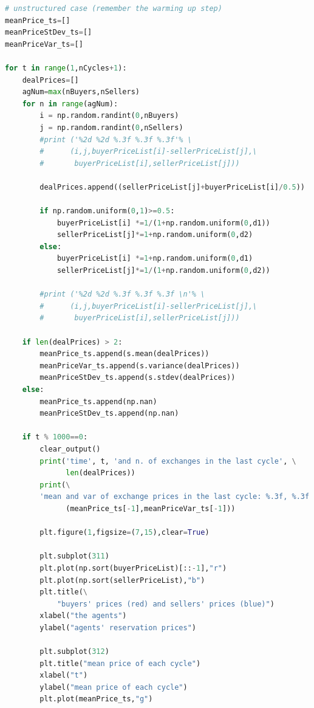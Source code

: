 \documentclass[12pt]{report}
\begin{document}
\begin{lstlisting}[language=Python, caption=Warming up of the model, basicstyle=\ttfamily\footnotesize]
# unstructured case (remember the warming up step)
meanPrice_ts=[]
meanPriceStDev_ts=[]
meanPriceVar_ts=[]

for t in range(1,nCycles+1):    
    dealPrices=[]
    agNum=max(nBuyers,nSellers)
    for n in range(agNum):
        i = np.random.randint(0,nBuyers)
        j = np.random.randint(0,nSellers)
        #print ('%2d %2d %.3f %.3f %.3f'% \
        #      (i,j,buyerPriceList[i]-sellerPriceList[j],\
        #       buyerPriceList[i],sellerPriceList[j]))
        
        dealPrices.append((sellerPriceList[j]+buyerPriceList[i]/0.5))
        
        if np.random.uniform(0,1)>=0.5:    
            buyerPriceList[i] *=1/(1+np.random.uniform(0,d1))
            sellerPriceList[j]*=1+np.random.uniform(0,d2)
        else:
            buyerPriceList[i] *=1+np.random.uniform(0,d1)
            sellerPriceList[j]*=1/(1+np.random.uniform(0,d2))

        #print ('%2d %2d %.3f %.3f %.3f \n'% \
        #      (i,j,buyerPriceList[i]-sellerPriceList[j],\
        #       buyerPriceList[i],sellerPriceList[j]))
           
    if len(dealPrices) > 2:
        meanPrice_ts.append(s.mean(dealPrices))
        meanPriceVar_ts.append(s.variance(dealPrices))
        meanPriceStDev_ts.append(s.stdev(dealPrices))
    else:
        meanPrice_ts.append(np.nan)
        meanPriceStDev_ts.append(np.nan)

    if t % 1000==0:
        clear_output()
        print('time', t, 'and n. of exchanges in the last cycle', \
              len(dealPrices))
        print(\
        'mean and var of exchange prices in the last cycle: %.3f, %.3f' %\
              (meanPrice_ts[-1],meanPriceVar_ts[-1]))

        plt.figure(1,figsize=(7,15),clear=True)

        plt.subplot(311)
        plt.plot(np.sort(buyerPriceList)[::-1],"r")
        plt.plot(np.sort(sellerPriceList),"b")
        plt.title(\
            "buyers' prices (red) and sellers' prices (blue)")
        xlabel("the agents")
        ylabel("agents' reservation prices")

        plt.subplot(312)
        plt.title("mean price of each cycle")
        xlabel("t")
        ylabel("mean price of each cycle")
        plt.plot(meanPrice_ts,"g")
        

\end{lstlisting}
\end{document}
